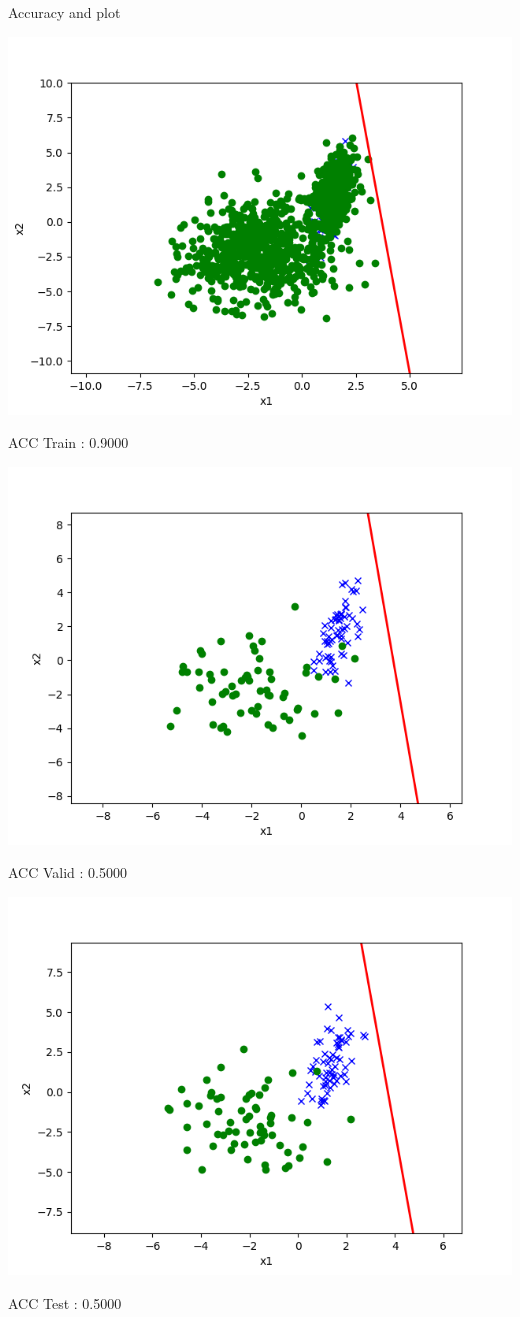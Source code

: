\begin{answer}
Accuracy and plot

\includegraphics[width=1\textwidth]{posonly/posonly_naive_plot_train.png}

ACC Train : 0.9000

\includegraphics[width=1\textwidth]{posonly/posonly_naive_plot_valid.png}

ACC Valid : 0.5000

\includegraphics[width=1\textwidth]{posonly/posonly_naive_plot_test.png}

ACC Test  : 0.5000

\end{answer}
